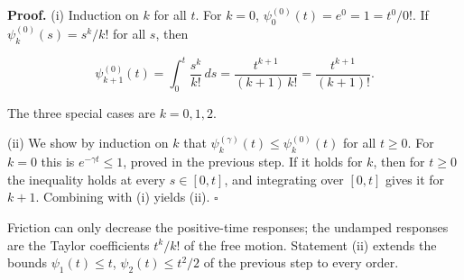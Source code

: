 \documentclass[11pt,a4paper]{article}
\begin{document}
\textbf{Proof.} (i) Induction on \(k\) for all \(t\). For \(k=0\), \(\psi_0^{(0)}(t)=e^{0}=1=t^0/0!\). If \(\psi_k^{(0)}(s)=s^k/k!\) for all \(s\), then


\[\psi_{k+1}^{(0)}(t)=\int_0^t\frac{s^k}{k!}\,ds=\frac{t^{k+1}}{(k+1)\,k!}=\frac{t^{k+1}}{(k+1)!}.\]


The three special cases are \(k=0,1,2\).




(ii) We show by induction on \(k\) that \(\psi_k^{(\gamma)}(t)\le\psi_k^{(0)}(t)\) for all \(t\ge0\). For \(k=0\) this is \(e^{-\gamma t}\le1\), proved in the previous step. If it holds for \(k\), then for \(t\ge0\) the inequality holds at every \(s\in[0,t]\), and integrating over \([0,t]\) gives it for \(k+1\). Combining with (i) yields (ii). \(\square\)




Friction can only decrease the positive-time responses; the undamped responses are the Taylor coefficients \(t^k/k!\) of the free motion. Statement (ii) extends the bounds \(\psi_1(t)\le t\), \(\psi_2(t)\le t^2/2\) of the previous step to every order.
\end{document}
